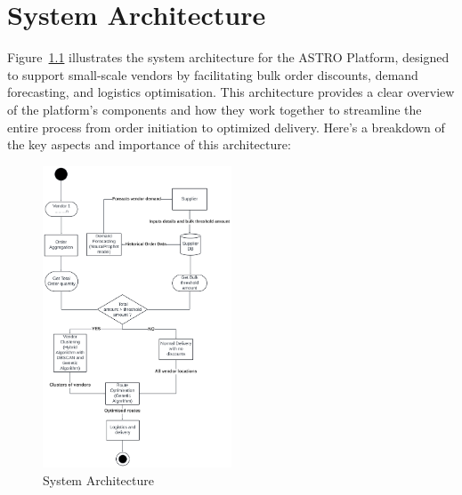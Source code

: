 
\chapter{System Architecture}



\noindent Figure~\ref{fig:architecture} illustrates the system architecture for the ASTRO Platform, designed to support small-scale vendors by facilitating bulk order discounts, demand forecasting, and logistics optimisation. This architecture provides a clear overview of the platform’s components and how they work together to streamline the entire process from order initiation to optimized delivery. Here’s a breakdown of the key aspects and importance of this architecture:

\begin{figure}[h]
    \centering
    \includegraphics[width=0.5\textwidth]{Figures/sys_arch.pdf}
    \caption{System Architecture}
    \label{fig:architecture}
\end{figure}


